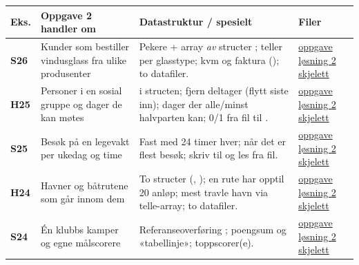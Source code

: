 \begin{center}
\small
\begin{longtable}{@{}L{0.9cm}L{4.0cm}L{8.6cm}L{1.8cm}@{}}
\toprule
\textbf{Eks.} & \textbf{Oppgave 2 handler om} & \textbf{Datastruktur / spesielt} & \textbf{Filer} \\
\midrule
\endhead
\textbf{S26} & Kunder som bestiller vindusglass fra ulike produsenter & Pekere  + array \emph{av} structer ;  teller per glasstype; kvm og faktura (); to datafiler. & \href{https://frh.folk.ntnu.no/grprog/eksamen/ex_s26.pdf}{oppgave} \newline \href{https://frh.folk.ntnu.no/grprog/eksamen/ex_s26_2.c}{løsning 2} \newline \href{https://frh.folk.ntnu.no/grprog/eksamen/ex_s26_2.tpl}{skjelett} \\
\textbf{H25} & Personer i en sosial gruppe og dager de kan møtes &  i structen; fjern deltager (flytt siste inn); dager der alle/minst halvparten kan; 0/1 fra fil til . & \href{https://frh.folk.ntnu.no/grprog/eksamen/ex_h25.pdf}{oppgave} \newline \href{https://frh.folk.ntnu.no/grprog/eksamen/ex_h25_2.c}{løsning 2} \newline \href{https://frh.folk.ntnu.no/grprog/eksamen/ex_h25_2.tpl}{skjelett} \\
\textbf{S25} & Besøk på en legevakt per ukedag og time & Fast  med 24 timer hver; når det er flest besøk; skriv til og les fra fil. & \href{https://frh.folk.ntnu.no/grprog/eksamen/ex_s25.pdf}{oppgave} \newline \href{https://frh.folk.ntnu.no/grprog/eksamen/ex_s25_2.c}{løsning 2} \newline \href{https://frh.folk.ntnu.no/grprog/eksamen/ex_s25_2.tpl}{skjelett} \\
\textbf{H24} & Havner og båtrutene som går innom dem & To structer (, ); en rute har opptil 20 anløp; mest travle havn via telle-array; to datafiler. & \href{https://frh.folk.ntnu.no/grprog/eksamen/ex_h24.pdf}{oppgave} \newline \href{https://frh.folk.ntnu.no/grprog/eksamen/ex_h24_2.c}{løsning 2} \newline \href{https://frh.folk.ntnu.no/grprog/eksamen/ex_h24_2.tpl}{skjelett} \\
\textbf{S24} & Én klubbs kamper og egne målscorere & Referanseoverføring ; poengsum og «tabellinje»; toppscorer(e). & \href{https://frh.folk.ntnu.no/grprog/eksamen/ex_s24.pdf}{oppgave} \newline \href{https://frh.folk.ntnu.no/grprog/eksamen/ex_s24_2.c}{løsning 2} \newline \href{https://frh.folk.ntnu.no/grprog/eksamen/ex_s24_2.tpl}{skjelett} \\

\end{longtable}
\end{center}

